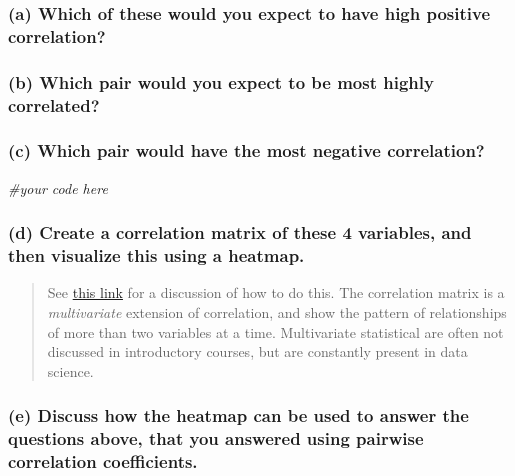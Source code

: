 \documentclass[
]{article}
\newenvironment{Shaded}{\begin{snugshade}}{\end{snugshade}}
\newcommand{\CommentTok}[1]{\textcolor[rgb]{0.56,0.35,0.01}{\textit{#1}}}
\begin{document}
\subsubsection{(a) Which of these would you expect to have high positive
correlation?}\label{a-which-of-these-would-you-expect-to-have-high-positive-correlation}

\subsubsection{(b) Which pair would you expect to be most highly
correlated?}\label{b-which-pair-would-you-expect-to-be-most-highly-correlated}

\subsubsection{(c) Which pair would have the most negative
correlation?}\label{c-which-pair-would-have-the-most-negative-correlation}

\begin{Shaded}
\begin{Highlighting}[]
\CommentTok{\#your code here}
\end{Highlighting}
\end{Shaded}

\subsubsection{(d) Create a correlation matrix of these 4 variables, and
then visualize this using a
heatmap.}\label{d-create-a-correlation-matrix-of-these-4-variables-and-then-visualize-this-using-a-heatmap.}

\begin{quote}
See
\href{https://www.r-bloggers.com/2023/08/exploring-relationships-with-correlation-heatmaps-in-r/}{this
link} for a discussion of how to do this. The correlation matrix is a
\emph{multivariate} extension of correlation, and show the pattern of
relationships of more than two variables at a time. Multivariate
statistical are often not discussed in introductory courses, but are
constantly present in data science.
\end{quote}

\subsubsection{(e) Discuss how the heatmap can be used to answer the
questions above, that you answered using pairwise correlation
coefficients.}\label{e-discuss-how-the-heatmap-can-be-used-to-answer-the-questions-above-that-you-answered-using-pairwise-correlation-coefficients.}
\end{document}
